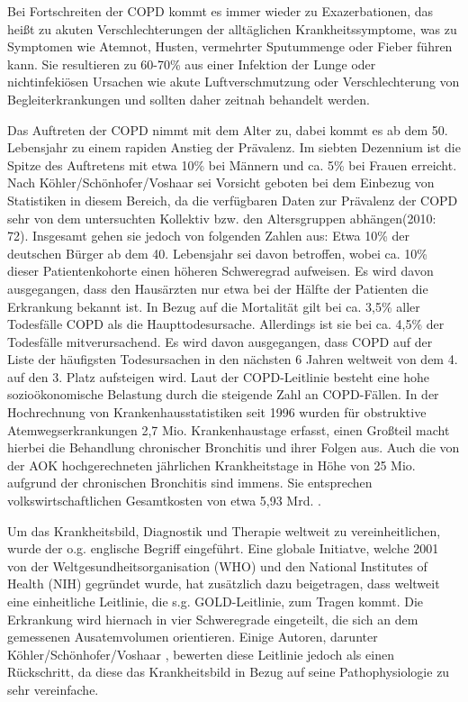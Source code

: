 Bei Fortschreiten der COPD kommt es immer wieder zu Exazerbationen, das heißt zu akuten Verschlechterungen der alltäglichen Krankheitssymptome, was zu Symptomen wie Atemnot, Husten, vermehrter Sputummenge oder Fieber führen kann. Sie resultieren zu 60-70\% aus einer Infektion der Lunge oder nichtinfekiösen Ursachen wie akute Luftverschmutzung oder Verschlechterung von Begleiterkrankungen und sollten daher zeitnah behandelt werden.

Das Auftreten der COPD nimmt mit dem Alter zu, dabei kommt es ab dem 50. Lebensjahr zu einem rapiden Anstieg der Prävalenz. Im siebten Dezennium ist die Spitze des Auftretens mit etwa 10\% bei Männern und ca. 5\% bei Frauen erreicht\autocite[vgl.][153]{lorenz2009}. Nach Köhler/Schönhofer/Voshaar sei Vorsicht geboten bei dem Einbezug von Statistiken in diesem Bereich, da die verfügbaren Daten zur Prävalenz der COPD sehr von dem untersuchten Kollektiv bzw. den Altersgruppen abhängen(2010: 72). Insgesamt gehen sie jedoch von folgenden Zahlen aus: Etwa 10\% der deutschen Bürger ab dem 40. Lebensjahr sei davon betroffen, wobei ca. 10\% dieser Patientenkohorte einen höheren Schweregrad aufweisen. Es wird davon ausgegangen, dass den Hausärzten nur etwa bei der Hälfte der Patienten die Erkrankung bekannt ist.
In Bezug auf die Mortalität gilt bei ca. 3,5\% aller Todesfälle COPD als die Haupttodesursache. Allerdings ist sie bei ca. 4,5\% der Todesfälle mitverursachend. Es wird davon ausgegangen, dass COPD auf der Liste der häufigsten Todesursachen in den nächsten 6 Jahren weltweit von dem 4. auf den 3. Platz aufsteigen wird.
Laut der COPD-Leitlinie besteht eine hohe sozioökonomische Belastung durch die steigende Zahl an COPD-Fällen. In der Hochrechnung von Krankenhausstatistiken seit 1996 wurden für obstruktive Atemwegserkrankungen 2,7 Mio. Krankenhaustage erfasst, einen Großteil macht hierbei die Behandlung chronischer Bronchitis und ihrer Folgen aus. Auch die von der AOK hochgerechneten jährlichen Krankheitstage in Höhe von 25 Mio. aufgrund der chronischen Bronchitis sind immens. Sie entsprechen volkswirtschaftlichen Gesamtkosten von etwa 5,93 Mrd. \autocite[vgl.][e4]{vogelmeier2007}.

Um das Krankheitsbild, Diagnostik und Therapie weltweit zu vereinheitlichen, wurde der o.g. englische Begriff eingeführt. Eine globale Initiatve, welche 2001 von der Weltgesundheitsorganisation (WHO) und den National Institutes of Health (NIH) gegründet wurde, hat zusätzlich dazu beigetragen, dass weltweit eine einheitliche Leitlinie, die s.g. GOLD-Leitlinie, zum Tragen kommt. Die Erkrankung wird hiernach in vier Schweregrade eingeteilt, die sich an dem gemessenen Ausatemvolumen orientieren. Einige Autoren, darunter Köhler/Schönhofer/Voshaar \autocite[vgl.][75]{koehler2010}, bewerten diese Leitlinie jedoch als einen Rückschritt, da diese das Krankheitsbild in Bezug auf seine Pathophysiologie zu sehr vereinfache.

